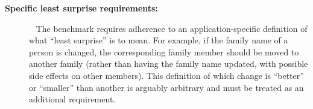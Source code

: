 \begin{description}
	\item[\textbf{Specific least surprise requirements:}]~
	The bench\-mark requires adherence to an application-specific definition of what ``least surprise'' is to mean.
	For example, if the family name of a person is changed, the corresponding family member should be moved to another family (rather than having the family name updated, with possible side effects on other members).
	This definition of which change is ``better'' or ``smaller'' than another is arguably arbitrary and must be treated as an additional requirement.
\end{description}